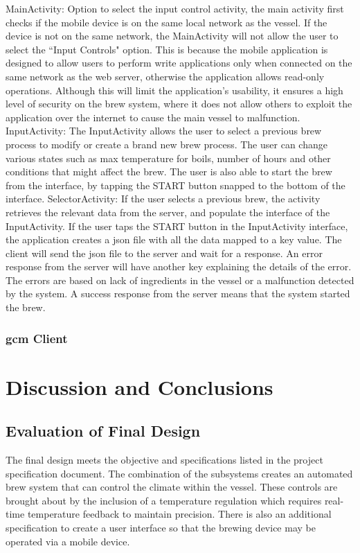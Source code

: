 \documentclass{article}
\begin{document}
MainActivity: Option to select the input control activity, the main activity first checks if the mobile device is on the same local network as the vessel. If the device is not on the same network, the MainActivity will not allow the user to select the ``Input Controls" option. This is because the mobile application is designed to allow users to perform write applications only when connected on the same network as the web server, otherwise the application allows read-only operations. Although this will limit the application's usability, it ensures a high level of security on the brew system, where it does not allow others to exploit the application over the internet to cause the main vessel to malfunction. 
InputActivity: The InputActivity allows the user to select a previous brew process to modify or create a brand new brew process. The user can change various states such as max temperature for boils, number of hours and other conditions that might affect the brew. The user is also able to start the brew from the interface, by tapping the START button snapped to the bottom of the interface.
SelectorActivity: If the user selects a previous brew, the activity retrieves the relevant data from the server, and populate the interface of the InputActivity.
If the user taps the START button in the InputActivity interface, the application creates a \gls{json} file with all the data mapped to a key value. The client will send the \gls{json} file to the server and wait for a response. An error response from the server will have another key explaining the details of the error. The errors are based on lack of ingredients in the vessel or a malfunction detected by the system. A success response from the server means that the system started the brew.

\subsubsection{\gls{gcm} Client}


\section{Discussion and Conclusions}
\subsection{Evaluation of Final Design}
The final design meets the objective and specifications listed in the project specification document. The combination of the subsystems creates an automated brew system that can control the climate within the vessel.  These controls are brought about by the inclusion of a temperature regulation which requires real-time temperature feedback to maintain precision. There is also an additional specification to create a user interface so that the brewing device may be operated via a mobile device.
\end{document}
